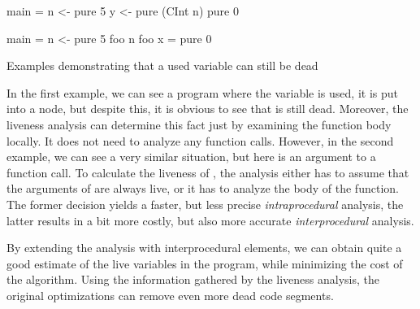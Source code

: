 \documentclass[main.tex]{subfiles}
\begin{document}
	\begin{codeFloat}[h]
		\begin{center}
			\begin{minipage}{0.35\textwidth}
				\begin{haskell}
					main = 
					  n <- pure 5
					  y <- pure (CInt n)
					  pure 0
				\end{haskell}
			\end{minipage}
			\hspace{1cm}
			\begin{minipage}{0.35\textwidth}
				\begin{haskell}
					main = 
					  n <- pure 5
					  foo n
					foo x = pure 0
				\end{haskell}
			\end{minipage}
		\end{center}
		\caption{Examples demonstrating that a used variable can still be dead}
		\label{code:lva-example}
	\end{codeFloat}

	In the first example, we can see a program where the variable  is used, it is put into a  node, but despite this, it is obvious to see that  is still dead. Moreover, the liveness analysis can determine this fact just by examining the function body locally. It does not need to analyze any function calls. However, in the second example, we can see a very similar situation, but here  is an argument to a function call. To calculate the liveness of , the analysis either has to assume that the arguments of  are always live, or it has to analyze the body of the function. The former decision yields a faster, but less precise \emph{intraprocedural} analysis, the latter results in a bit more costly, but also more accurate \emph{interprocedural} analysis.
	
	By extending the analysis with interprocedural elements, we can obtain quite a good estimate of the live variables in the program, while minimizing the cost of the algorithm. Using the information gathered by the liveness analysis, the original optimizations can remove even more dead code segments.
	
	

	
\end{document}
